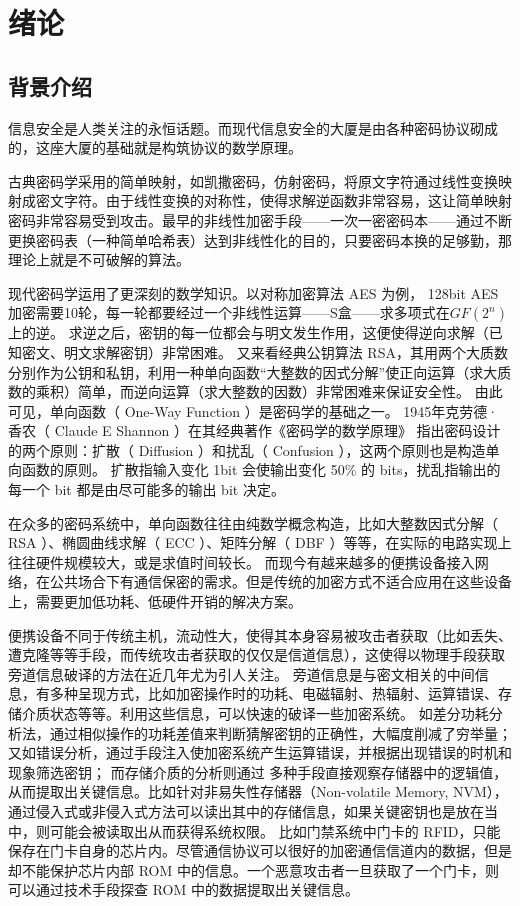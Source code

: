 
\chapter{绪论}
\section{背景介绍}\label{sec:background}
信息安全是人类关注的永恒话题。而现代信息安全的大厦是由各种密码协议砌成的，这座大厦的基础就是构筑协议的数学原理。

古典密码学采用的简单映射，如凯撒密码，仿射密码，将原文字符通过线性变换映射成密文字符。由于线性变换的对称性，使得求解逆函数非常容易，这让简单映射密码非常容易受到攻击。最早的非线性加密手段——一次一密密码本——通过不断更换密码表（一种简单哈希表）达到非线性化的目的，只要密码本换的足够勤，那理论上就是不可破解的算法。

现代密码学运用了更深刻的数学知识。以对称加密算法 AES 为例， 128bit AES 加密需要10轮，每一轮都要经过一个非线性运算——S盒——求多项式在$GF(2^n)$上的逆。
求逆之后，密钥的每一位都会与明文发生作用，这便使得逆向求解（已知密文、明文求解密钥）非常困难\supercite{rijmen2001advanced}。
又来看经典公钥算法 RSA，其用两个大质数分别作为公钥和私钥，利用一种单向函数``大整数的因式分解''使正向运算（求大质数的乘积）简单，而逆向运算（求大整数的因数）非常困难来保证安全性。
由此可见，单向函数（ One-Way Function ）是密码学的基础之一。
1945年克劳德·香农（ Claude E Shannon ）在其经典著作《密码学的数学原理》\supercite{shannon1945mathematical} 指出密码设计的两个原则：扩散（ Diffusion ）和扰乱（ Confusion ），这两个原则也是构造单向函数的原则。
扩散指输入变化 1bit 会使输出变化 50\% 的 bits，扰乱指输出的每一个 bit 都是由尽可能多的输出 bit 决定。

在众多的密码系统中，单向函数往往由纯数学概念构造，比如大整数因式分解（ RSA ）、椭圆曲线求解（ ECC ）、矩阵分解\supercite{wendt2013bidirectional}（ DBF ）等等，在实际的电路实现上往往硬件规模较大，或是求值时间较长。
而现今有越来越多的便携设备接入网络，在公共场合下有通信保密的需求。但是传统的加密方式不适合应用在这些设备上，需要更加低功耗、低硬件开销的解决方案。

便携设备不同于传统主机，流动性大，使得其本身容易被攻击者获取（比如丢失、遭克隆等等手段，而传统攻击者获取的仅仅是信道信息），这使得以物理手段获取旁道信息破译的方法在近几年尤为引人关注\supercite{standaert2010introduction}。
旁道信息是与密文相关的中间信息，有多种呈现方式，比如加密操作时的功耗、电磁辐射、热辐射、运算错误、存储介质状态等等。利用这些信息，可以快速的破译一些加密系统。
如差分功耗分析法，通过相似操作的功耗差值来判断猜解密钥的正确性，大幅度削减了穷举量；
又如错误分析，通过手段注入使加密系统产生运算错误，并根据出现错误的时机和现象筛选密钥；
而存储介质的分析则通过 多种手段直接观察存储器中的逻辑值，从而提取出关键信息。比如针对非易失性存储器（Non-volatile Memory, NVM），通过侵入式或非侵入式方法可以读出其中的存储信息，如果关键密钥也是放在当中，则可能会被读取出从而获得系统权限\supercite{helfmeier2013cloning}。
比如门禁系统中门卡的 RFID，只能保存在门卡自身的芯片内。尽管通信协议可以很好的加密通信信道内的数据，但是却不能保护芯片内部 ROM 中的信息。一个恶意攻击者一旦获取了一个门卡，则可以通过技术手段探查 ROM 中的数据提取出关键信息。

